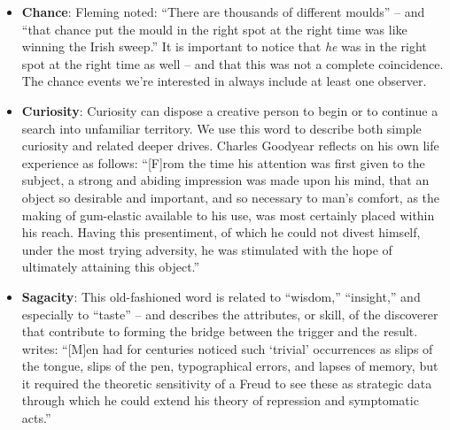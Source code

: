 \begin{itemize}
\item \textbf{Chance}: Fleming \citeyear{fleming} noted: ``There are
  thousands of different moulds'' -- and ``that chance put the mould
  in the right spot at the right time was like winning the Irish
  sweep.''  It is important to notice that \emph{he} was in the right
  spot at the right time as well -- and that this was not a complete
  coincidence.  The chance events we're interested in always include
  at least one observer.
\end{itemize}

\begin{itemize}
\item \textbf{Curiosity}: Curiosity can dispose a creative person to
  begin or to continue a search into unfamiliar territory.  We use
  this word to describe both simple curiosity and related deeper
  drives.  Charles Goodyear \citeyear{goodyear1855gum} reflects on his
  own life experience as follows: ``[F]rom the time his attention was first given
  to the subject, a strong and abiding impression was made upon his
  mind, that an object so desirable and important, and so necessary to
  man's comfort, as the making of gum-elastic available to his use,
  was most certainly placed within his reach.  Having this
  presentiment, of which he could not divest himself, under the most
  trying adversity, he was stimulated with the hope of ultimately
  attaining this object.''
\end{itemize}

\begin{itemize}
\item \textbf{Sagacity}: This old-fashioned word is related to
  ``wisdom,'' ``insight,'' and especially to ``taste'' -- and
  describes the attributes, or skill, of the discoverer that
  contribute to forming the bridge between the trigger and the result.
   writes: ``{[}M{]}en had for centuries
  noticed such `trivial' occurrences as slips of the tongue, slips of
  the pen, typographical errors, and lapses of memory, but it required
  the theoretic sensitivity of a Freud to see these as strategic data
  through which he could extend his theory of repression and
  symptomatic acts.''
\end{itemize}


